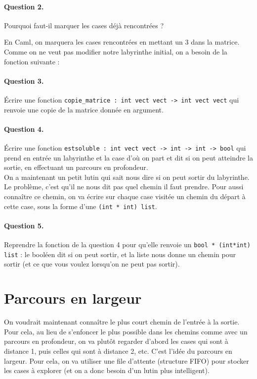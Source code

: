 \documentclass[10pt,a4paper]{article}
\begin{document}
\paragraph{Question 2.} Pourquoi faut-il marquer les cases déjà rencontrées ?

En Caml, on marquera les cases rencontrées en mettant un 3 dans la matrice.
Comme on ne veut pas modifier notre labyrinthe initial, on a besoin de la
fonction suivante :
\paragraph{Question 3.} Écrire une fonction \texttt{copie\_matrice : int vect vect -> int vect vect} qui renvoie
une copie de la matrice donnée en argument.

\paragraph{Question 4.} Écrire une fonction
\texttt{estsoluble : int vect vect -> int -> int -> bool} qui prend en entrée un
labyrinthe et la case d'où on part et dit si on peut atteindre la sortie, en
effectuant un parcours en profondeur.
\\

On a maintenant un petit lutin qui sait nous dire si on peut sortir du
labyrinthe. Le problème, c'est qu'il ne nous dit pas quel chemin il faut
prendre. Pour aussi connaître ce chemin, on va écrire sur chaque case visitée
un chemin du départ à cette case, sous la forme d'une \texttt{(int * int) list}.

\paragraph{Question 5.} Reprendre la fonction de la question 4 pour qu'elle
renvoie un \texttt{bool * (int*int) list} : le booléen dit si on peut sortir,
et la liste nous donne un chemin pour sortir (et ce que vous voulez lorsqu'on ne
peut pas sortir).

\section{Parcours en largeur}
On voudrait maintenant connaître le plus court chemin de l'entrée à la sortie.
Pour cela, au lieu de s'enfoncer le plus possible dans les chemins comme avec
un parcours en profondeur, on va plutôt regarder d'abord les cases qui sont
à distance 1, puis celles qui sont à distance 2, etc. C'est l'idée du parcours
en largeur. Pour cela, on va utiliser une file d'attente (structure FIFO) pour
stocker les cases à explorer (et on a donc besoin d'un lutin plus intelligent).
\end{document}
